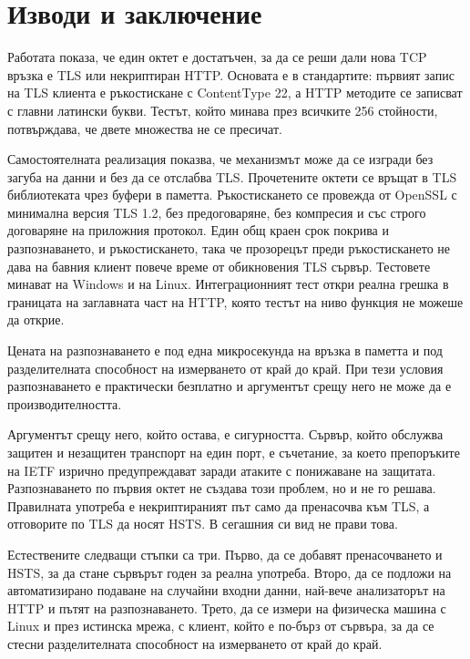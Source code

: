 \section{Изводи и заключение}
\label{sec:conclusion}

Работата показа, че един октет е достатъчен, за да се реши дали нова TCP връзка е TLS
или некриптиран HTTP. Основата е в стандартите: първият запис на TLS клиента е
ръкостискане с ContentType 22, а HTTP методите се записват с главни латински букви.
Тестът, който минава през всичките 256 стойности, потвърждава, че двете множества не се
пресичат.

Самостоятелната реализация  показва, че механизмът може да се изгради без
загуба на данни и без да се отслабва TLS. Прочетените октети се връщат в TLS
библиотеката чрез буфери в паметта. Ръкостискането се провежда от OpenSSL с минимална
версия TLS 1.2, без предоговаряне, без компресия и със строго договаряне на приложния
протокол. Един общ краен срок покрива и разпознаването, и ръкостискането, така че
прозорецът преди ръкостискането не дава на бавния клиент повече време от обикновения
TLS сървър. Тестовете минават на Windows и на Linux. Интеграционният тест откри реална
грешка в границата на заглавната част на HTTP, която тестът на ниво функция не можеше да
открие.

Цената на разпознаването е под една микросекунда на връзка в паметта и под
разделителната способност на измерването от край до край. При тези условия
разпознаването е практически безплатно и аргументът срещу него не може да е
производителността.

Аргументът срещу него, който остава, е сигурността. Сървър, който обслужва защитен и
незащитен транспорт на един порт, е съчетание, за което препоръките на IETF изрично
предупреждават заради атаките с понижаване на защитата. Разпознаването по първия октет
не създава този проблем, но и не го решава. Правилната употреба е некриптираният път
само да пренасочва към TLS, а отговорите по TLS да носят HSTS. В сегашния си вид
 не прави това.

Естествените следващи стъпки са три. Първо, да се добавят пренасочването и HSTS, за да
стане сървърът годен за реална употреба. Второ, да се подложи на автоматизирано
подаване на случайни входни данни, най-вече анализаторът на HTTP и пътят на
разпознаването. Трето, да се измери на физическа машина с Linux и през истинска мрежа,
с клиент, който е по-бърз от сървъра, за да се стесни разделителната способност на
измерването от край до край.
